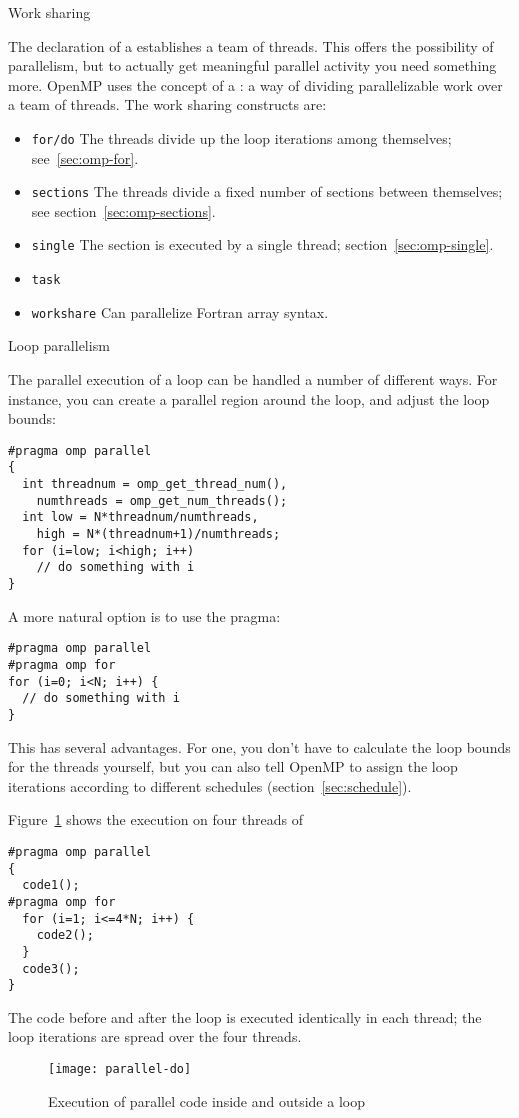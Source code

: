  {Work sharing}

The declaration of a  establishes a team of
threads. This offers the possibility of parallelism, but to actually
get meaningful parallel activity you need something more.
OpenMP uses the concept of a : a way of dividing parallelizable work over a team of threads.
The work sharing constructs are:
\begin{itemize}
\item \texttt{for/do} The threads divide up the loop iterations among
  themselves; see~\ref{sec:omp-for}.
\item \texttt{sections} The threads divide a fixed number of sections
  between themselves; see section~\ref{sec:omp-sections}.
\item \texttt{single} The section is executed by a single thread; section~\ref{sec:omp-single}.
\item \texttt{task}
\item \texttt{workshare} Can parallelize Fortran array syntax.
\end{itemize}

 {Loop parallelism}

The parallel execution of a loop can be handled a number of different ways.
For instance, you can create a parallel region around the loop, and
adjust the loop bounds:
\begin{verbatim}
#pragma omp parallel
{
  int threadnum = omp_get_thread_num(),
    numthreads = omp_get_num_threads();
  int low = N*threadnum/numthreads,
    high = N*(threadnum+1)/numthreads;
  for (i=low; i<high; i++)
    // do something with i
}
\end{verbatim}

A more natural option is to use the
 pragma:
\begin{verbatim}
#pragma omp parallel
#pragma omp for
for (i=0; i<N; i++) {
  // do something with i
}
\end{verbatim}
This has several advantages. For one, you don't have to calculate the loop bounds
for the threads yourself, but you can also tell OpenMP to assign the loop
iterations according to different schedules (section~\ref{sec:schedule}).

Figure~\ref{fig:omp-par-do} shows the execution on four threads of
\begin{verbatim}
#pragma omp parallel
{
  code1();
#pragma omp for
  for (i=1; i<=4*N; i++) {
    code2();
  }
  code3();
}
\end{verbatim}
The code before and after the loop is executed identically
in each thread; the loop iterations are spread over the four threads.
\begin{figure}[ht]
  \texttt{[image: parallel-do]}
  \caption{Execution of parallel code inside and outside a loop}
  \label{fig:omp-par-do}
\end{figure}


